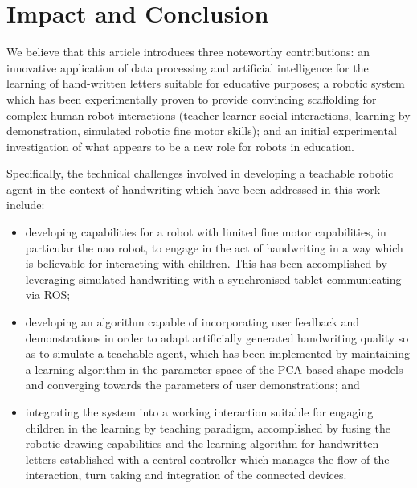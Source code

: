 \documentclass{sig-alternate}
\begin{document}
\section{Impact and Conclusion}\label{sec:conclusions}

We believe that this article introduces three noteworthy contributions: an innovative
application of data processing and artificial intelligence for the
learning of hand-written letters suitable for educative purposes; a robotic
system which has been experimentally proven to provide convincing scaffolding for
complex human-robot interactions (teacher-learner social interactions, learning by
demonstration, simulated robotic fine motor skills); and an initial experimental investigation of what appears to be a
new role for robots in education.

Specifically, the technical challenges involved in developing a teachable
robotic agent in the context of handwriting which have been addressed in this
work include:

\begin{itemize}

    \item developing capabilities for a robot with limited fine motor
        capabilities, in particular the {\sc nao} robot, to engage in the act of handwriting in a
        way which is believable for interacting with children. This has been
        accomplished by leveraging simulated handwriting with a synchronised
        tablet communicating via ROS;

    \item developing an algorithm capable of incorporating user feedback and
        demonstrations in order to adapt artificially generated handwriting quality so as
        to simulate a teachable agent, which has been implemented by maintaining
        a learning algorithm in the parameter space of the PCA-based shape models and
        converging towards the parameters of user demonstrations; and

    \item integrating the system into a working interaction suitable for
        engaging children in the learning by teaching paradigm, accomplished by
        fusing the robotic drawing capabilities and the learning algorithm for
        handwritten letters established with a central controller which manages
        the flow of the interaction, turn taking and integration of the connected 
	devices.

\end{itemize}
\end{document}
